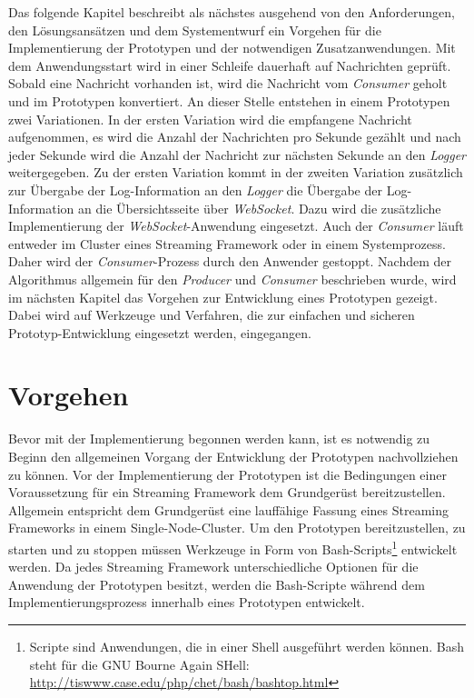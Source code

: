 Das folgende Kapitel beschreibt als nächstes ausgehend von den Anforderungen, den Lösungsansätzen und dem Systementwurf ein Vorgehen für die Implementierung der Prototypen und der notwendigen Zusatzanwendungen. Mit dem Anwendungsstart wird in einer Schleife dauerhaft auf Nachrichten geprüft. Sobald eine Nachricht vorhanden ist, wird die Nachricht vom \textit{Consumer} geholt und im Prototypen konvertiert. An dieser Stelle entstehen in einem Prototypen zwei Variationen. In der ersten Variation wird die empfangene Nachricht aufgenommen, es wird die Anzahl der Nachrichten pro Sekunde gezählt und nach jeder Sekunde wird die Anzahl der Nachricht zur nächsten Sekunde an den \textit{Logger} weitergegeben. Zu der ersten Variation kommt in der zweiten Variation zusätzlich zur Übergabe der Log-Information an den \textit{Logger} die Übergabe der Log-Information an die Übersichtsseite über \textit{WebSocket}. Dazu wird die zusätzliche Implementierung der \textit{WebSocket}-Anwendung eingesetzt. Auch der \textit{Consumer} läuft entweder im Cluster eines Streaming Framework oder in einem Systemprozess. Daher wird der \textit{Consumer}-Prozess durch den Anwender gestoppt. Nachdem der Algorithmus allgemein für den \textit{Producer} und \textit{Consumer} beschrieben wurde, wird im nächsten Kapitel das Vorgehen zur Entwicklung eines Prototypen gezeigt. Dabei wird auf Werkzeuge und Verfahren, die zur einfachen und sicheren Prototyp-Entwicklung eingesetzt werden, eingegangen.


\section{Vorgehen}
\label{sec:vorgehen}

Bevor mit der Implementierung begonnen werden kann, ist es notwendig zu Beginn den allgemeinen Vorgang der Entwicklung der Prototypen nachvollziehen zu können. Vor der Implementierung der Prototypen ist die Bedingungen einer Voraussetzung für ein Streaming Framework dem Grundgerüst bereitzustellen. Allgemein entspricht dem Grundgerüst eine lauffähige Fassung eines Streaming Frameworks in einem Single-Node-Cluster. Um den Prototypen bereitzustellen, zu starten und zu stoppen müssen Werkzeuge in Form von Bash-Scripts\footnote{Scripte sind Anwendungen, die in einer Shell ausgeführt werden können. Bash steht für die GNU Bourne Again SHell: \url{http://tiswww.case.edu/php/chet/bash/bashtop.html}} entwickelt werden. Da jedes Streaming Framework unterschiedliche Optionen für die Anwendung der Prototypen besitzt, werden die Bash-Scripte während dem Implementierungsprozess innerhalb eines Prototypen entwickelt.

